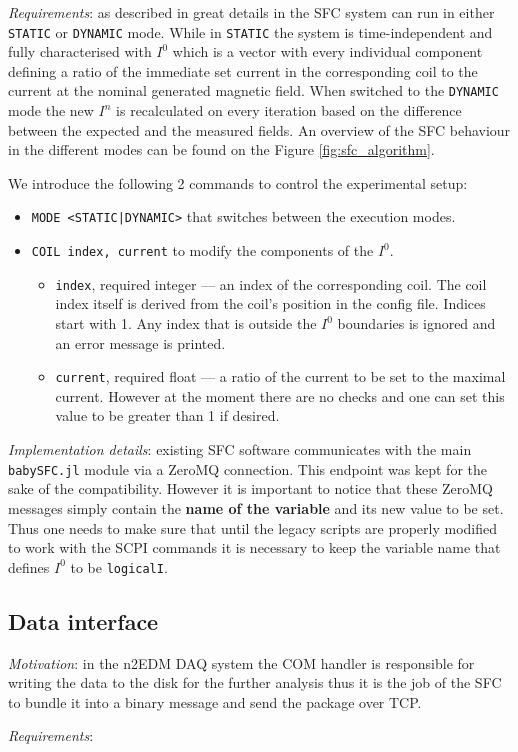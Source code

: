 \textit{Requirements}: as described in great details in \cite{Franke2013} the SFC system can run in either \texttt{STATIC} or \texttt{DYNAMIC} mode. While in \texttt{STATIC} the system is time-independent and fully characterised with $I^0$ which is a vector with every individual component defining a ratio of the immediate set current in the corresponding coil to the current at the nominal generated magnetic field. When switched to the \texttt{DYNAMIC} mode the new $I^n$ is recalculated on every iteration based on the difference between the expected and the measured fields. An overview of the SFC behaviour in the different modes can be found on the Figure \ref{fig:sfc_algorithm}.

We introduce the following 2 commands to control the experimental setup:
\begin{itemize}
	\item \texttt{MODE <STATIC|DYNAMIC>} that switches between the execution modes.
	\item{
		\texttt{COIL index, current} to modify the components of the $I^0$.
		\begin{itemize}
			\item \texttt{index}, required integer --- an index of the corresponding coil. The coil index itself is derived from the coil's position in the config file. Indices start with 1. Any index that is outside the $I^0$ boundaries is ignored and an error message is printed.
			\item \texttt{current}, required float --- a ratio of the current to be set to the maximal current. However at the moment there are no checks and one can set this value to be greater than 1 if desired.
		\end{itemize}
	}
\end{itemize}

\textit{Implementation details}: existing SFC software communicates with the main \texttt{babySFC.jl} module via a ZeroMQ connection. This endpoint was kept for the sake of the compatibility. However it is important to notice that these ZeroMQ messages simply contain the \textbf{name of the variable} and its new value to be set. Thus one needs to make sure that until the legacy scripts are properly modified to work with the SCPI commands it is necessary to keep the variable name that defines $I^0$ to be \texttt{logicalI}.

\subsection{Data interface}
\label{subsec:sfc_data}

\textit{Motivation}: in the n2EDM DAQ system the COM handler is responsible for writing the data to the disk for the further analysis thus it is the job of the SFC to bundle it into a binary message and send the package over TCP.

\textit{Requirements}:














